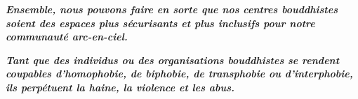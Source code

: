 \documentclass[12pt,openany]{book}
\renewenvironment{quote}{%
  \list{}{%
    \leftmargin-0.1cm   %
    \rightmargin\leftmargin
  }
  \item\relax
}
{\endlist}
\begin{document}
\begin{figure}[ht]
\end{figure}

\color{purple}
\begingroup
\begin{quote}
\doublespacing
\centering
\textit{\Large \textbf{Ensemble, nous pouvons faire en sorte que nos centres bouddhistes soient des espaces plus sécurisants et plus inclusifs pour notre communauté arc-en-ciel.}}
\end{quote}
\endgroup

\newpage
\thispagestyle{empty}

\begingroup
\begin{quote}
\doublespacing
\centering
\textit{\Large \textbf{Tant que des individus ou des organisations bouddhistes se rendent coupables d'homophobie, de biphobie, de transphobie ou d'interphobie, ils perpétuent la haine, la violence et les abus.}}
\end{quote}
\endgroup

\begin{figure}[h]
    \centering
\end{figure}
\end{document}
